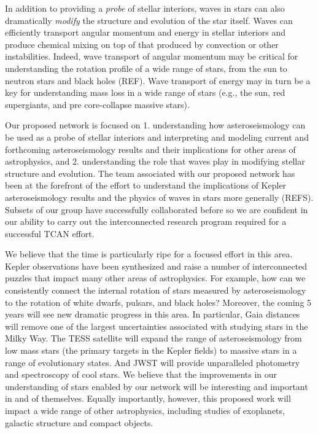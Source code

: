 In addition to providing a {\em probe} of stellar interiors, waves in stars can also dramatically {\em modify} the structure and evolution of the star itself.   Waves can efficiently transport angular momentum and energy in stellar interiors and produce chemical mixing on top of that produced by convection or other instabilities.   Indeed, wave transport of angular momentum may be critical for understanding the rotation profile of a wide range of stars, from the sun to neutron stars and black holes (REF).   Wave transport of energy may in turn be a key for understanding mass loss in a wide range of stars (e.g., the sun, red supergiants, and pre core-collapse massive stars).   

Our proposed network is focused on 1.  understanding how asteroseismology can be used as a probe of stellar interiors and interpreting and modeling current and forthcoming asteroseismology results and their implications for other areas of astrophysics, and 2.  understanding the role that waves play in modifying stellar structure and evolution.  The team associated with our proposed network has been at the forefront of the effort to understand the implications of Kepler asteroseismology results and the physics of waves in stars more generally (REFS).  Subsets of our group have successfully collaborated before so we are confident in our ability to carry out the interconnected research program required for a successful TCAN effort.   

We believe that the time is particularly ripe for a focused effort in this area.  Kepler observations have been synthesized and raise a number of interconnected puzzles that impact many other areas of astrophysics.  For example, how can we consistently connect the internal rotation of stars measured by asteroseismology to the rotation of white dwarfs, pulsars, and black holes?   Moreover, the coming 5 years will see new dramatic progress in this area. In particular, Gaia distances will remove one of the largest uncertainties associated with studying stars in the Milky Way.  The TESS satellite will expand the range of asteroseismology from low mass stars (the primary targets in the Kepler fields) to massive stars in a range of evolutionary states.   And JWST will provide unparalleled photometry and spectroscopy of cool stars.    We believe that the improvements in our understanding of stars enabled by our network will be interesting and important in and of themselves.  Equally importantly, however, this proposed work will impact a wide range of other astrophysics, including studies of exoplanets, galactic structure and compact objects.   


